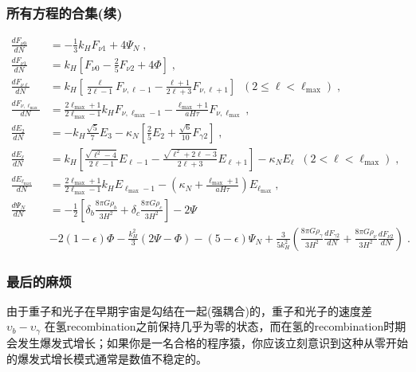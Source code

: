 \documentclass[CJK,13pt]{beamer}
\begin{document}
  \begin{frame}
    \frametitle{所有方程的合集(续)}
{\tiny
\begin{align}  
\frac{d F_{\nu 0}}{dN} &=  - \frac{1}{3} k_H F_{\nu 1} + 4 \Psi_N\;, \\
\frac{d F_{\nu 1}}{dN} &= k_H\left[  F_{\nu 0} - \frac{2}{5} F_{\nu 2} + 4 \Phi\right]\;,\\
\frac{d F_{\nu \ell}}{dN} &= k_H \left[\frac{\ell}{2\ell - 1} F_{\nu, \ell - 1} - \frac{\ell+1}{2\ell + 3} F_{\nu,\ell+1}\right]\; \;(2\le\ell<\ell_{\max})\;,\\
\frac{dF_{\nu, \ell_{\max}}}{dN} &= \frac{2\ell_{\max}+1}{2\ell_{\max}-1} k_HF_{\nu,\ell_{\max}-1} - \frac{\ell_{\max}+1}{aH\tau} F_{\nu,\ell_{\max}}\;,\\
\frac{d E_2}{dN} &= -k_H \frac{\sqrt{5}}{7}E_3 - \kappa_N\left[\frac{2}{5} E_2 + \frac{\sqrt{6}}{10} F_{\gamma 2}\right]\; ,\\
\frac{dE_\ell}{dN} &= k_H \left[\frac{\sqrt{\ell^2-4}}{2\ell-1} E_{\ell-1} - \frac{\sqrt{\ell^2+2\ell-3}}{2\ell+3} E_{\ell+1}\right] - \kappa_N E_{\ell}\;\;(2<\ell<\ell_{\max})\;, \\
\frac{dE_{\ell_{\max}}}{dN} &= \frac{2\ell_{\max}+1}{2\ell_{\max}-1}k_H E_{\ell_{\max}-1} - \left(\kappa_N + \frac{\ell_{\max}+1}{aH\tau}\right)E_{\ell_{\max}}\;, \label{eq:hieend}\\
\frac{d\Psi_N}{dN} &= -\frac{1}{2}\left[\delta_b\frac{8\pi G\rho_b}{3H^2} + \delta_c\frac{8\pi G\rho_c}{3H^2} \right] - 2\Psi \nonumber \\ 
& - 2(1-\epsilon)\Phi   - \frac{k_H^2}{3}(2\Psi - \Phi) - (5-\epsilon)\Psi_N  + \frac{3}{5k_H^2}\left(\frac{8\pi G\rho_\gamma}{3H^2}\frac{dF_{\gamma 2}}{dN} + \frac{8\pi G\rho_\nu}{3H^2}\frac{dF_{\nu 2}}{dN}\right) \;. \label{eq:PsiNN}
\end{align}
}
  \end{frame}
    

    \begin{frame}
      \frametitle{最后的麻烦}      
      由于重子和光子在早期宇宙是勾结在一起(强耦合)的，重子和光子的速度差 $\upsilon_b - \upsilon_\gamma$ 在氢recombination之前保持几乎为零的状态，而在氢的recombination时期会发生爆发式增长；如果你是一名合格的程序猿，你应该立刻意识到这种从零开始的爆发式增长模式通常是数值不稳定的。
      

      
    \end{frame}
\end{document}
